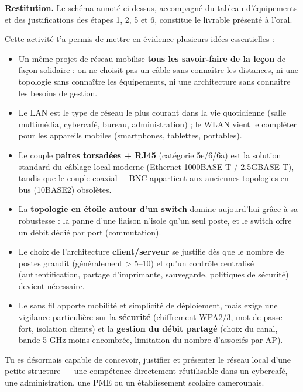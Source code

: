 \documentclass[11pt]{article}
\newcommand{\cle}[1]{{\popxbold\color{popdark}#1}}
\newcounter{popsec}
\newcounter{popsub}
\newcommand{\courssub}[1]{%
  \stepcounter{popsub}%
  \par\vspace{9pt}\noindent{\popxbold\fontsize{11.5}{13}\selectfont\color{popink}{\color{poporange}\thepopsec.\thepopsub}\hspace{6pt}#1}\par\nopagebreak\vspace{4pt}
}
\begin{document}
\begin{exoresolu}
\textbf{Restitution.} Le schéma annoté ci-dessus, accompagné du tableau d'équipements et des justifications des étapes 1, 2, 5 et 6, constitue le livrable présenté à l'oral.
\end{exoresolu}

\courssub{Bilan de l'activité}

Cette activité t'a permis de mettre en évidence plusieurs idées essentielles :

\begin{itemize}
  \item Un même projet de réseau mobilise \textbf{tous les savoir-faire de la leçon} de façon solidaire : on ne choisit pas un câble sans connaître les distances, ni une topologie sans connaître les équipements, ni une architecture sans connaître les besoins de gestion.
  \item Le \cle{LAN} est le type de réseau le plus courant dans la vie quotidienne (salle multimédia, cybercafé, bureau, administration) ; le \cle{WLAN} vient le compléter pour les appareils mobiles (smartphones, tablettes, portables).
  \item Le couple \textbf{paires torsadées + RJ45} (catégorie 5e/6/6a) est la solution standard du câblage local moderne (Ethernet 1000BASE-T / 2.5GBASE-T), tandis que le couple coaxial + BNC appartient aux anciennes topologies en bus (10BASE2) obsolètes.
  \item La \textbf{topologie en étoile autour d'un switch} domine aujourd'hui grâce à sa robustesse : la panne d'une liaison n'isole qu'un seul poste, et le switch offre un débit dédié par port (commutation).
  \item Le choix de l'architecture \textbf{client/serveur} se justifie dès que le nombre de postes grandit (généralement > 5--10) et qu'un contrôle centralisé (authentification, partage d'imprimante, sauvegarde, politiques de sécurité) devient nécessaire.
  \item Le sans fil apporte mobilité et simplicité de déploiement, mais exige une vigilance particulière sur la \textbf{sécurité} (chiffrement WPA2/3, mot de passe fort, isolation clients) et la \textbf{gestion du débit partagé} (choix du canal, bande 5 GHz moins encombrée, limitation du nombre d'associés par AP).
\end{itemize}

Tu es désormais capable de concevoir, justifier et présenter le réseau local d'une petite structure — une compétence directement réutilisable dans un cybercafé, une administration, une PME ou un établissement scolaire camerounais.
\end{document}
